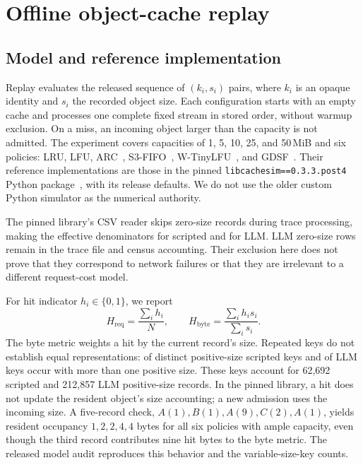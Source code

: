 \documentclass[10pt,sigconf,nonacm]{acmart}
\newcommand{\mib}{\,MiB\xspace}
\begin{document}
\section{Offline object-cache replay}
\label{sec:replay}
\subsection{Model and reference implementation}
Replay evaluates the released sequence of $(k_i,s_i)$ pairs, where $k_i$ is an opaque identity and $s_i$ the recorded object size. Each configuration starts with an empty cache and processes one complete fixed stream in stored order, without warmup exclusion. On a miss, an incoming object larger than the capacity is not admitted. The experiment covers capacities of 1, 5, 10, 25, and 50\mib and six policies: LRU, LFU, ARC~\cite{arc}, S3-FIFO~\cite{s3fifo}, W-TinyLFU~\cite{tinylfu}, and GDSF~\cite{gdsf}. Their reference implementations are those in the pinned \texttt{libcachesim==0.3.3.post4} Python package~\cite{libcachesim}, with its release defaults. We do not use the older custom Python simulator as the numerical authority.

The pinned library's CSV reader skips zero-size records during trace processing, making the effective denominators \BTScriptedReplay{} for scripted and \BTLLMReplay{} for LLM. LLM zero-size rows remain in the trace file and census accounting. Their exclusion here does not prove that they correspond to network failures or that they are irrelevant to a different request-cost model.

For hit indicator $h_i\in\{0,1\}$, we report
\begin{equation}
H_{\mathrm{req}}=\frac{\sum_i h_i}{N},\qquad
H_{\mathrm{byte}}=\frac{\sum_i h_i s_i}{\sum_i s_i}.
\label{eq:rates}
\end{equation}
The byte metric weights a hit by the current record's size. Repeated keys do not establish equal representations: \BTScriptedVaryingKeys{} of \BTScriptedPositiveKeys{} distinct positive-size scripted keys and \BTLLMVaryingKeys{} of \BTLLMPositiveKeys{} LLM keys occur with more than one positive size. These keys account for 62{,}692 scripted and 212{,}857 LLM positive-size records. In the pinned library, a hit does not update the resident object's size accounting; a new admission uses the incoming size. A five-record check, $A(1),B(1),A(9),C(2),A(1)$, yields resident occupancy $1,2,2,4,4$ bytes for all six policies with ample capacity, even though the third record contributes nine hit bytes to the byte metric. The released model audit reproduces this behavior and the variable-size-key counts.
\end{document}
